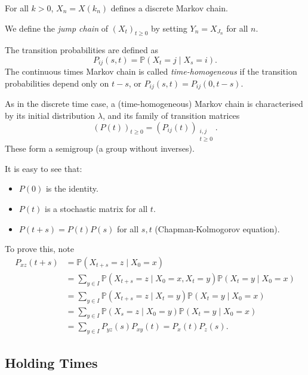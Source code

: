 \documentclass[12pt]{article}
\begin{document}
For all $k > 0$, $X_n = X(k_n)$ defines a discrete Markov chain.

\begin{definition}
	We define the \emph{jump chain} of $(X_t)_{t \geq 0}$ by setting $Y_n = X_{J_n}$ for all $n$.
\end{definition}

\begin{definition}
	The transition probabilities are defined as
	\[
	P_{ij}(s,t) = \mathbb{P}(X_t = j \mid X_s = i)
	.\]
	The continuous times Markov chain is called \emph{time-homogeneous} if the transition probabilities depend only on $t - s$, or $P_{ij}(s,t) = P_{ij}(0,t-s)$.
\end{definition}

As in the discrete time case, a (time-homogeneous) Markov chain is characterised by its initial distribution $\lambda$, and its family of transition matrices
\[
	(P(t))_{t \geq 0} = (P_{ij}(t))_{\substack{i,j\\t \geq 0}}
.\]
These form a semigroup (a group without inverses).

It is easy to see that:
\begin{itemize}
	\item $P(0)$ is the identity.
	\item $P(t)$ is a stochastic matrix for all $t$.
	\item $P(t+s) = P(t)P(s)$ for all $s, t$ (Chapman-Kolmogorov equation).
\end{itemize}
To prove this, note
\begin{align*}
	P_{xz}(t+s) &= \mathbb{P}(X_{t+s} = z \mid X_0 = x) \\
		    &= \sum_{y \in I} \mathbb{P}(X_{t+s} = z \mid X_0 = x, X_t = y) \mathbb{P}(X_t = y \mid X_0 = x) \\
		    &= \sum_{y \in I} \mathbb{P}(X_{t+s} = z \mid X_t = y) \mathbb{P}(X_t = y \mid X_0 = x) \\
		    &= \sum_{y \in I} \mathbb{P}(X_s = z \mid X_0 = y) \mathbb{P}(X_t = y \mid X_0 = x) \\
		    &= \sum_{y \in I}P_{yz}(s) P_{xy}(t) = P_x(t) P_z(s).
\end{align*}

\subsection{Holding Times}
\label{sub:holding_times}
\end{document}
